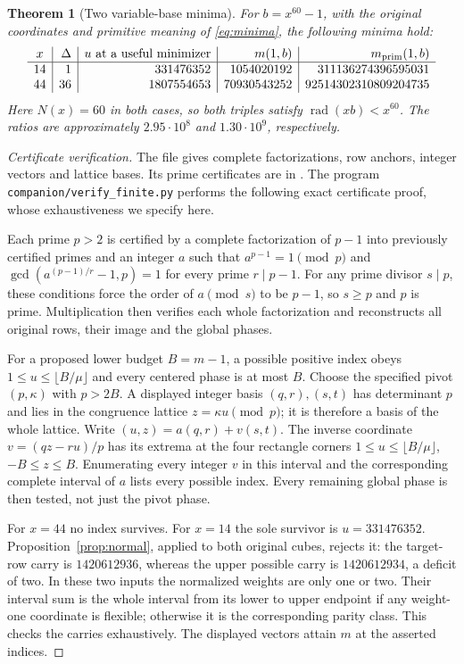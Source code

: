 \documentclass[11pt,a4paper]{article}
\newtheorem{theorem}{Theorem}[section]
\theoremstyle{definition}\newtheorem{question}[theorem]{Question}
\theoremstyle{remark}\newtheorem{remark}[theorem]{Remark}
\DeclareMathOperator{\rad}{rad}\DeclareMathOperator{\supp}{supp}
\begin{document}
\begin{theorem}[Two variable-base minima]\label{thm:finite}
For $b=x^{60}-1$, with the original coordinates and primitive meaning
of \eqref{eq:minima}, the following minima hold:
\[
\begin{array}{c|r|r|r|r}
 x&\Delta&u\text{ at a useful minimizer}&m(1,b)&m_{\mathrm{prim}}(1,b)\\\hline
14&1&331476352&1054020192&311136274396595031\\
44&36&1807554653&70930543252&92514302310809204735
\end{array}
\]
Here $N(x)=60$ in both cases, so both triples satisfy
$\rad(xb)<x^{60}$. The ratios are approximately
$2.95\cdot10^8$ and $1.30\cdot10^9$, respectively.
\end{theorem}
\begin{proof}[Certificate verification]
The file  gives complete
factorizations, row anchors, integer vectors and lattice bases.
Its prime certificates are in .
The program
\texttt{companion/verify\_finite.py} performs the following exact
certificate proof, whose exhaustiveness we specify here.

Each prime $p>2$ is certified by a complete factorization of $p-1$
into previously certified primes and an integer $a$ such that
$a^{p-1}=1\pmod p$ and
$\gcd(a^{(p-1)/r}-1,p)=1$ for every prime $r\mid p-1$.
For any prime divisor $s\mid p$, these conditions force the order
of $a\pmod s$ to be $p-1$, so $s\ge p$ and $p$ is prime.
Multiplication then verifies each whole factorization and reconstructs
all original rows, their image and the global phases.

For a proposed lower budget $B=m-1$, a possible positive index obeys
$1\le u\le\lfloor B/\mu\rfloor$ and every centered phase is at most
$B$. Choose the specified pivot $(p,\kappa)$ with $p>2B$.
A displayed integer basis $(q,r),(s,t)$ has determinant $p$ and lies
in the congruence lattice $z=\kappa u\pmod p$; it is therefore a
basis of the whole lattice. Write
$(u,z)=a(q,r)+v(s,t)$. The inverse coordinate
$v=(qz-ru)/p$ has its extrema at the four rectangle corners
$1\le u\le\lfloor B/\mu\rfloor$, $-B\le z\le B$.
Enumerating every integer $v$ in this interval and the corresponding
complete interval of $a$ lists every possible index. Every remaining
global phase is then tested, not just the pivot phase.

For $x=44$ no index survives. For $x=14$ the sole survivor is
$u=331476352$. Proposition~\ref{prop:normal}, applied to both
original cubes, rejects it: the target-row carry is $1420612936$,
whereas the upper possible carry is $1420612934$, a deficit of two.
In these two inputs the normalized weights are only one or two.
Their interval sum is the whole interval from its lower to upper
endpoint if any weight-one coordinate is flexible; otherwise it is
the corresponding parity class. This checks the carries exhaustively.
The displayed vectors attain $m$ at the asserted indices.


\end{proof}
\end{document}
